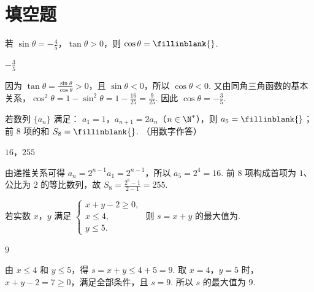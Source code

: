 \section{填空题}

\begin{problem}
若 \(\sin \theta = -\frac{4}{5}\)，\(\tan \theta > 0\)，则 \(\cos \theta =\fillinblank{}\).
\end{problem}

\begin{answer}
\(-\frac{3}{5}\)
\end{answer}

\begin{solution}
因为 \(\tan\theta=\frac{\sin\theta}{\cos\theta}>0\)，且 \(\sin\theta<0\)，所以 \(\cos\theta<0\). 又由同角三角函数的基本关系，\(\cos^2\theta=1-\sin^2\theta=1-\frac{16}{25}=\frac{9}{25}\). 因此 \(\cos\theta=-\frac{3}{5}\).
\end{solution}

\begin{problem}
若数列 \(\{a_{n}\}\) 满足： \(a_{1} = 1\)，\(a_{n+1} = 2a_{n}\)（\(n \in \N^*\)），则 \(a_{5} =\fillinblank{}\)；前 \(8\) 项的和 \(S_{8} =\fillinblank{}\). （用数字作答）
\end{problem}

\begin{answer}
\(16\)，\(255\)
\end{answer}

\begin{solution}
由递推关系可得 \(a_n=2^{n-1}a_1=2^{n-1}\)，所以 \(a_5=2^4=16\). 前 8 项构成首项为 \(1\)、公比为 \(2\) 的等比数列，故 \(S_8=\frac{2^8-1}{2-1}=255\).
\end{solution}

\begin{problem}
若实数 \(x\)，\(y\) 满足 \(\begin{cases}
x + y - 2 \geqslant 0,\\
x \leqslant 4,\\
y \leqslant 5.
\end{cases}\) 则 \(s = x + y\) 的最大值为\fillinblank{}.
\end{problem}

\begin{answer}
\(9\)
\end{answer}

\begin{solution}
由 \(x\leqslant4\) 和 \(y\leqslant5\)，得 \(s=x+y\leqslant4+5=9\). 取 \(x=4\)，\(y=5\) 时，\(x+y-2=7\geqslant0\)，满足全部条件，且 \(s=9\). 所以 \(s\) 的最大值为 \(9\).
\end{solution}

